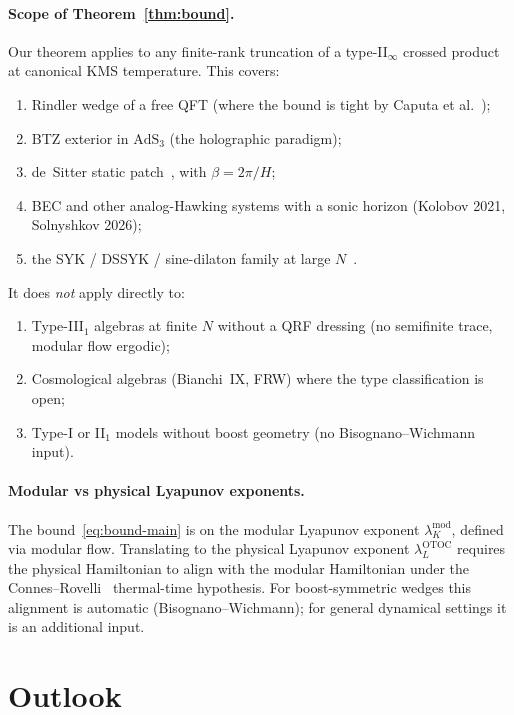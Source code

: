 \documentclass[12pt,a4paper]{article}
\begin{document}
\paragraph{Scope of Theorem~\ref{thm:bound}.}
Our theorem applies to any finite-rank truncation of a type-II$_\infty$
crossed product at canonical KMS temperature.
This covers:
\begin{enumerate}
\item Rindler wedge of a free QFT (where the bound is tight by
Caputa et al.~\cite{Caputa2024});
\item BTZ exterior in $\mathrm{AdS}_3$ (the holographic paradigm);
\item de~Sitter static patch~\cite{CLPW2023}, with $\beta = 2\pi/H$;
\item BEC and other analog-Hawking systems with a sonic horizon
(Kolobov 2021, Solnyshkov 2026);
\item the SYK / DSSYK / sine-dilaton family at large
$N$~\cite{Parker2019,HellerPapalini2024}.
\end{enumerate}
It does \emph{not} apply directly to:
\begin{enumerate}
\item Type-III$_1$ algebras at finite $N$ without a QRF dressing
(no semifinite trace, modular flow ergodic);
\item Cosmological algebras (Bianchi~IX, FRW) where the type
classification is open;
\item Type-I or II$_1$ models without boost geometry (no
Bisognano--Wichmann input).
\end{enumerate}

\paragraph{Modular vs physical Lyapunov exponents.}
The bound~\eqref{eq:bound-main} is on the modular Lyapunov exponent
$\lambda_K^{\mathrm{mod}}$, defined via modular flow.
Translating to the physical Lyapunov exponent
$\lambda_L^{\mathrm{OTOC}}$ requires the physical Hamiltonian to
align with the modular Hamiltonian under the
Connes--Rovelli~\cite{ConnesRovelli1994} thermal-time hypothesis.
For boost-symmetric wedges this alignment is automatic
(Bisognano--Wichmann); for general dynamical settings it is an
additional input.

\section{Outlook}
\label{sec:outlook}
\end{document}
